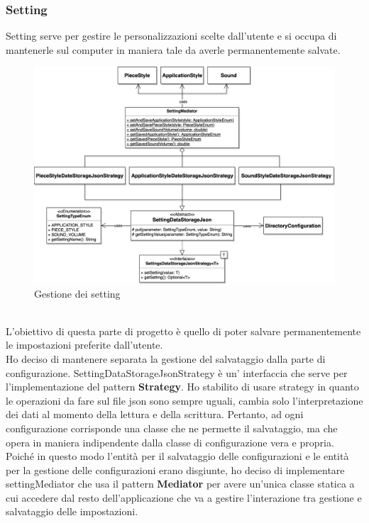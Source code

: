 \documentclass[a4paper,12pt]{report}
\begin{document}
\subsubsection*{Setting}
Setting serve per gestire le personalizzazioni scelte dall'utente e si occupa di mantenerle sul computer in maniera tale da averle permanentemente salvate.
\begin{figure}[H]
    \begin{center}
        \centering
        \includegraphics[width=\textwidth]{img/Tommaso/settings.png}
    \end{center}
    \caption{Gestione dei setting}
    \label{img:settings}
\end{figure}
\
\\
L'obiettivo di questa parte di progetto è quello di poter salvare permanentemente le impostazioni preferite dall'utente.\\
Ho deciso di mantenere separata la gestione del salvataggio dalla parte di configurazione.
SettingDataStorageJsonStrategy è un' interfaccia che serve per l'implementazione del pattern \textbf{Strategy}. Ho stabilito di usare strategy in quanto le operazioni da fare sul file json sono sempre uguali, cambia solo l'interpretazione dei dati al momento della lettura e della scrittura. 
Pertanto, ad ogni configurazione corrisponde una classe che ne permette il salvataggio, ma che opera in maniera indipendente dalla classe di configurazione vera e propria.\\
Poiché in questo modo l'entità per il salvataggio delle configurazioni e le entità per la gestione delle configurazioni erano disgiunte, ho deciso di implementare settingMediator che usa il pattern \textbf{Mediator} per avere un'unica classe statica a cui accedere dal resto dell'applicazione che va a gestire l'interazione tra gestione e salvataggio delle impostazioni.
\end{document}
